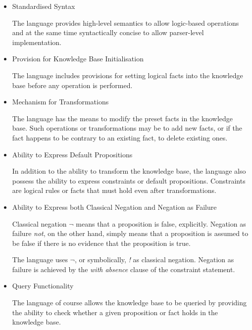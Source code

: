 \documentclass[a4paper]{article}
\begin{document}
      \begin{itemize}
        \item
          Standardised Syntax

          The language provides high-level semantics to allow logic-based
          operations and at the same time syntactically concise to allow
          parser-level implementation.

        \item
          Provision for Knowledge Base Initialisation

          The language includes provisions for setting logical facts into
          the knowledge base before any operation is performed.

        \item
          Mechanism for Transformations

          The language has the means to modify the preset facts in the
          knowledge base. Such operations or transformations may be to add 
          new facts, or if the fact happens to be contrary to an existing
          fact, to delete existing ones.

        \item
          Ability to Express Default Propositions

          In addition to the ability to transform the knowledge base, the 
          language also possess the ability to express constraints or default
          propositions. Constraints are logical rules or facts that must hold 
          even after transformations.

        \item
          Ability to Express both Classical Negation and Negation as Failure

          Classical negation \emph{$\lnot$} means that a proposition is
          false, explicitly. Negation as failure \emph{not}, on the other 
          hand, simply means that a proposition is assumed to be false if
          there is no evidence that the proposition is true. \cite{GV}

          The language uses \emph{$\lnot$}, or symbolically, \emph{!} as
          classical negation. Negation as failure is achieved by the
          \emph{with absence} clause of the constraint statement.

        \item
          Query Functionality

          The language of course allows the knowledge base to be queried by
          providing the ability to check whether a given proposition or fact
          holds in the knowledge base.
          
      \end{itemize}
\end{document}
